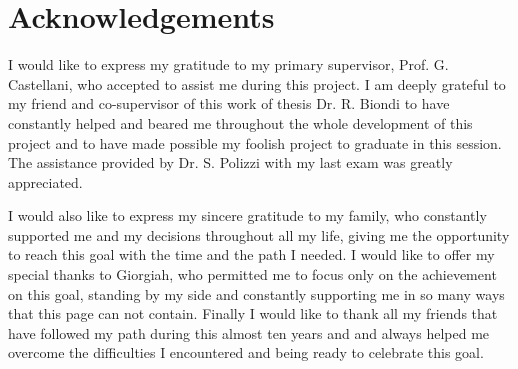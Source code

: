 \documentclass{standalone}
\begin{document}
\chapter*{Acknowledgements}

I would like to express my gratitude to my primary supervisor, Prof. G. Castellani, who accepted to assist me during this project.
I am deeply grateful to my friend and co-supervisor of this work of thesis Dr. R. Biondi to have constantly helped and beared me throughout the whole development of this project and to have made possible my foolish project to graduate in this session.
The assistance provided by Dr. S. Polizzi with my last exam was greatly appreciated.

I would also like to express my sincere gratitude to my family, who constantly supported me and my decisions throughout all my life, giving me the opportunity to reach this goal with the time and the path I needed.
I would like to offer my special thanks to Giorgiah, who permitted me to focus only on the achievement on this goal, standing by my side and constantly supporting me in so many ways that this page can not contain.
Finally I would like to thank all my friends that have followed my path during this almost ten years and and always helped me overcome the difficulties I encountered and being ready to celebrate this goal.
\end{document}
